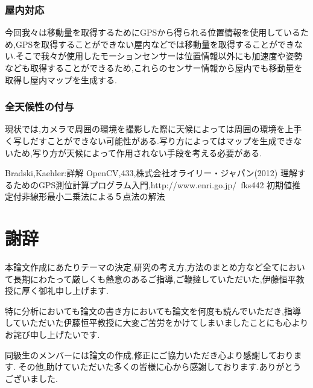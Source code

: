 \documentclass[12pt,oneside]{sotsuken_paper}
\begin{document}
\subsection{屋内対応}
今回我々は移動量を取得するためにGPSから得られる位置情報を使用しているため,GPSを取得することができない屋内などでは移動量を取得することができない.そこで我々が使用したモーションセンサーは位置情報以外にも加速度や姿勢なども取得することができるため,これらのセンサー情報から屋内でも移動量を取得し屋内マップを生成する.

\subsection{全天候性の付与}
現状では,カメラで周囲の環境を撮影した際に天候によっては周囲の環境を上手く写しだすことができない可能性がある.写り方によってはマップを生成できないため,写り方が天候によって作用されない手段を考える必要がある.

\begin{thebibliography}{8}
 Bradski,Kaehler:詳解 OpenCV,433,株式会社オライリー・ジャパン(2012)
 理解するためのGPS測位計算プログラム入門,http://www.enri.go.jp/~fks442%
 初期値推定付非線形最小二乗法による５点法の解法
\end{thebibliography}



\chapter*{謝辞}
本論文作成にあたりテーマの決定,研究の考え方,方法のまとめ方など全てにおいて長期にわたって厳しくも熱意のあるご指導,ご鞭撻していただいた,伊藤恒平教授に厚く御礼申し上げます.


特に分析においても論文の書き方においても論文を何度も読んでいただき,指導していただいた伊藤恒平教授に大変ご苦労をかけてしまいましたことにも心よりお詫び申し上げたいです.


同級生のメンバーには論文の作成,修正にご協力いただき心より感謝しております.
その他,助けていただいた多くの皆様に心から感謝しております.ありがとうございました.
\end{document}
